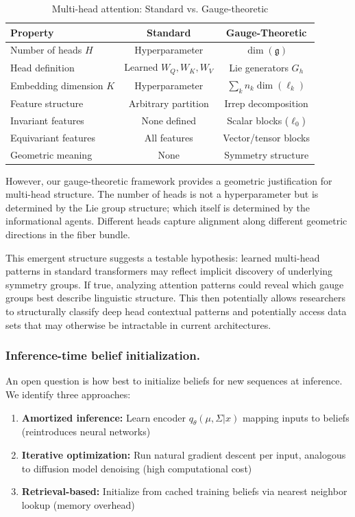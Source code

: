 \documentclass[twoside,11pt]{article}
\begin{document}
\begin{table}[h]
\centering
\caption{Multi-head attention: Standard vs. Gauge-theoretic}
\label{tab:multihead_comparison}
\begin{tabular}{lcc}
\toprule
\textbf{Property} & \textbf{Standard} & \textbf{Gauge-Theoretic} \\
\midrule
Number of heads $H$ & Hyperparameter & $\dim(\mathfrak{g})$ \\
Head definition & Learned $W_Q, W_K, W_V$ & Lie generators $G_h$ \\
Embedding dimension $K$ & Hyperparameter & $\sum_k n_k \dim(\ell_k)$ \\
Feature structure & Arbitrary partition & Irrep decomposition \\
Invariant features & None defined & Scalar blocks ($\ell_0$) \\
Equivariant features & All features & Vector/tensor blocks \\
Geometric meaning & None & Symmetry structure \\
\bottomrule
\end{tabular}
\end{table}

However, our gauge-theoretic framework provides a geometric justification for multi-head structure. The number of heads is not a hyperparameter but is determined by the Lie group structure; which itself is determined by the informational agents. Different heads capture alignment along different geometric directions in the fiber bundle.

This emergent structure suggests a testable hypothesis: learned multi-head patterns in standard transformers may reflect implicit discovery of underlying symmetry groups. If true, analyzing attention patterns could reveal which gauge groups best describe linguistic structure.  This then potentially allows researchers to structurally classify deep head contextual patterns and potentially access data sets that may otherwise be intractable in current architectures.


\subsubsection{Inference-time belief initialization.} 

An open question is how best to initialize beliefs for new sequences at inference. We identify three approaches:

\begin{enumerate}
\item \textbf{Amortized inference:} Learn encoder $q_\theta(\mu, \Sigma | x)$ mapping inputs to beliefs (reintroduces neural networks)
\item \textbf{Iterative optimization:} Run natural gradient descent per input, analogous to diffusion model denoising (high computational cost)
\item \textbf{Retrieval-based:} Initialize from cached training beliefs via nearest neighbor lookup (memory overhead)
\end{enumerate}
\end{document}
